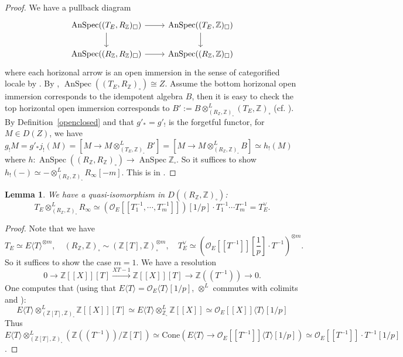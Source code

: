 \documentclass[a4paper,10pt]{amsart}
\theoremstyle{remark}
\theoremstyle{definition}
\theoremstyle{plain}
\newtheorem{lemma}[theorem]{Lemma}
\numberwithin{equation}{section}
\newcommand{\bbZ}{{\mathbb Z}}
\newcommand{\calO}{{\mathcal O}}
\newcommand{\Cone}{\mathrm{Cone}}
\DeclareMathOperator{\AnSpec}{AnSpec}
\begin{document}
\begin{proof}
	We have a pullback diagram
	\[
	\begin{tikzcd}
	\AnSpec((T_E,R_{\bbZ})_\square)
	\arrow[r]
	\arrow[d]
	& \AnSpec((T_E,\bbZ)_\square)
	\arrow[d]\\
	\AnSpec((R_{\bbZ},R_{\bbZ})_\square)
	\arrow[r]
	& \AnSpec((R_{\bbZ},\bbZ)_\square)
	\end{tikzcd}
	\]
	where each horizonal arrow is an open immersion in the sense of categorified locale by \cite[\S~8]{scholze2019condensed}. By \cite[Prop.~3.32]{andreychev2021pseudocoherent}, $\AnSpec((T_E,R_{\bbZ})_\square)\cong Z$. Assume the bottom horizonal open immersion corresponds to the idempotent algebra $B$, then it is easy to check the top horizontal open immersion corresponds to $B':=B\otimes^L_{(R_{\bbZ},\bbZ)_\square} (T_E,\bbZ)_\square$ (cf. \cite[Lem.~6.4(4)]{scholze2022complex}). By Definition~\ref{openclosed} and that $g'_*=g'_!$ is the forgetful functor, for $M\in D(Z)$, we have $g_!M=g'_*j_!(M)=[M\to M\otimes^L_{(T_E,\bbZ)_\square} B']=[M\to M\otimes_{(R_{\bbZ},\bbZ)_\square}^L B]\simeq h_!(M)$ where $h:\AnSpec((R_{\bbZ},R_{\bbZ})_\square)\to \AnSpec \bbZ_{\square}$. So it suffices to show $h_!(-)\simeq -\otimes^L_{(R_{\bbZ},\bbZ)_\square} R_{\infty}[-m]$. This is in \cite[Thm.~8.13]{scholze2019condensed}.
\end{proof}

\begin{lemma}\label{lemmatensor}
	We have a quasi-isomorphism in $D((R_{\bbZ},\bbZ)_\square)$:
	$$T_E\otimes^L_{(R_{\bbZ},\bbZ)_\square} R_{\infty}\simeq (\calO_E[[T_1^{-1},\cdots,T_m^{-1}]])[1/p]\cdot T_1^{-1}\cdots T_m^{-1} =T_E^{\vee}.$$
\end{lemma}

\begin{proof}
	Note that we have\begin{equation*}
		T_E\simeq E\langle T\rangle^{\otimes m}, \quad (R_{\bbZ},\bbZ)_\square\sim (\bbZ[T],\bbZ)^{\otimes m}_\square,\quad T_E^{\vee}\simeq(\calO_E[[T^{-1}]][\frac{1}{p}]\cdot T^{-1})^{\otimes m}.
	\end{equation*}
	So it suffices to show the case $m=1$. We have a resolution
	$$0\longrightarrow \bbZ[[X]][T]\stackrel{XT-1}\longrightarrow \bbZ[[X]][T]\longrightarrow \bbZ((T^{-1}))\longrightarrow 0.$$
	One computes that (using that $E\langle T\rangle=\calO_E\langle T\rangle[1/p]$,  $\otimes^L$ commutes with colimits and \cite[Prop.~6.3]{scholze2019condensed}):
	$$E\langle T\rangle\otimes_{(\bbZ[T],\bbZ)_\square}^L \bbZ[[X]][T]\simeq E\langle T\rangle\otimes_{\bbZ_\square}^L \bbZ[[X]]\simeq \calO_E[[X]]\langle T\rangle [1/p]$$
	Thus $E\langle T \rangle\otimes_{(\bbZ[T],\bbZ)_\square}^L (\bbZ((T^{-1}))/\bbZ[T])\simeq \Cone(E\langle T\rangle\rightarrow \calO_E[[T^{-1}]]\langle  T\rangle[1/p])\simeq \calO_E[[T^{-1}]]\cdot T^{-1}[1/p]$.
\end{proof}
\end{document}
